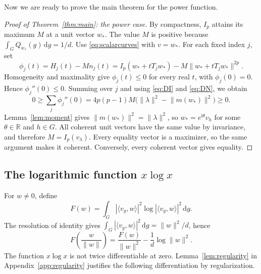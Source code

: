 \documentclass[11pt,reqno]{amsart}
\numberwithin{equation}{section}
\theoremstyle{plain}
\theoremstyle{remark}
\newcommand{\R}{\mathbb R}
\newcommand{\ii}{\mathrm i}
\newcommand{\dd}{\,\mathrm d}
\newcommand{\norm}[1]{\lVert#1\rVert}
\newcommand{\ip}[2]{\langle#1,#2\rangle}
\begin{document}
Now we are ready to prove the main theorem for the power function.

\begin{proof}[Proof of Theorem~\ref{thm:main}: the power case]
By compactness, $I_p$ attains its maximum $M$ at a unit vector $w_*$.
The value $M$ is positive because $\int_G Q_{w_*}(g)\dd g=1/d$.
Use \eqref{eq:scalarcurves} with $v=w_*$.  For each fixed index $j$, set
\[
 \phi_j(t)=H_j(t)-M n_j(t)
       =I_p(w_*+tT_jw_*)-M\norm{w_*+tT_jw_*}^{2p}.
\]
Homogeneity and maximality give $\phi_j(t)\le0$ for every real $t$,
with $\phi_j(0)=0$.  Hence $\phi_j''(0)\le0$.  Summing over $j$ and
using \eqref{eq:DI} and \eqref{eq:DN}, we obtain
\[
 0\ge\sum_j \phi_j''(0)
 =4p(p-1)M\bigl(\norm{\lambda}^2-\norm{m(w_*)}^2\bigr)\ge0.
\]
Lemma~\ref{lem:moment} gives $\norm{m(w_*)}^2=\norm{\lambda}^2$, so
$w_*=e^{\ii\theta}v_h$ for some $\theta\in\R$ and $h\in G$.
All coherent unit vectors have the same value by invariance, and
therefore $M=I_p(v_\lambda)$.  Every equality vector is a maximizer,
so the same argument makes it coherent.  Conversely, every coherent
vector gives equality.
\end{proof}

\subsection{The logarithmic function \texorpdfstring{$x\log x$}{x log x}}\label{sec:shannon}

For $w\ne0$, define
\begin{equation}\label{eq:logfunctional}
 F(w)=\int_G|\ip{v_g}{w}|^2\log|\ip{v_g}{w}|^2\dd g.
\end{equation}
The resolution of identity gives $\int_G|\ip{v_g}{w}|^2\dd g=\norm w^2/d$, hence
\begin{equation}\label{eq:normalizedlog}
 F\!\left(\frac{w}{\norm w}\right)
 =\frac{F(w)}{\norm w^2}-\frac1d\log\norm w^2.
\end{equation}
The function $x\log x$ is not twice differentiable at zero.
Lemma~\ref{lem:regularity} in Appendix~\ref{app:regularity} justifies
the following differentiation by regularization.
\end{document}
